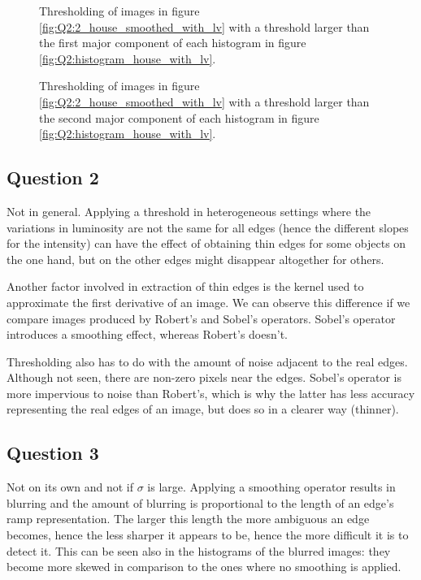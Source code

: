 \begin{figure}[H]
	\centering
	\scalebox{0.9}{}
	\caption{Thresholding of images in figure \ref{fig:Q2:2_house_smoothed_with_lv} with a threshold larger than the first major component of
	each histogram in figure \ref{fig:Q2:histogram_house_with_lv}.}
	\label{fig:Q2:threshold_house_1_with_lv}
\end{figure}

\begin{figure}[H]
	\centering
	\scalebox{0.9}{}
	\caption{Thresholding of images in figure \ref{fig:Q2:2_house_smoothed_with_lv} with a threshold larger than the second major component of
	each histogram in figure \ref{fig:Q2:histogram_house_with_lv}.}
	\label{fig:Q2:threshold_house_2_with_lv}
\end{figure}



\subsection{Question 2}

Not in general. Applying a threshold in heterogeneous settings where the
variations in luminosity are not the same for all edges
(hence the different slopes for the intensity) can have the effect of
obtaining thin edges for some objects on the one hand,
but on the other edges might disappear altogether for others.

Another factor involved in extraction of thin edges is the kernel used to
approximate the first derivative of an image.
We can observe this difference if we compare images produced by Robert's
and Sobel's operators. Sobel's operator introduces a smoothing effect, whereas Robert's doesn't.

Thresholding also has to do with the amount of noise adjacent to the real edges.
Although not seen, there are non-zero pixels near the edges.
Sobel's operator is more impervious to noise than Robert's, which is why the
latter has less accuracy representing the real edges of an image, but
does so in a clearer way (thinner).


\subsection{Question 3}

Not on its own and not if $\sigma$ is large. Applying a smoothing operator
results in blurring and the amount of blurring is proportional to the length of an
edge's ramp representation. The larger this length
the more ambiguous an edge becomes, hence the less sharper it appears to be,
hence the more difficult it is to detect it. This can be seen also in the histograms
of the blurred images: they become more skewed in comparison to the ones where
no smoothing is applied.

